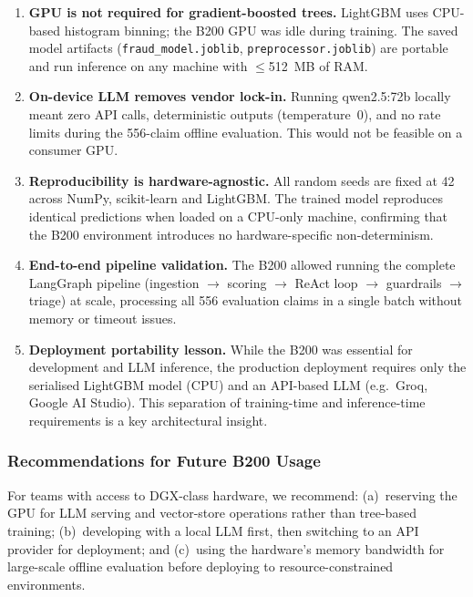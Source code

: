 \documentclass[12pt,a4paper]{article}
\begin{document}
\begin{enumerate}
    \item \textbf{GPU is not required for gradient-boosted trees.} LightGBM uses CPU-based histogram binning; the B200 GPU was idle during training. The saved model artifacts (\texttt{fraud\_model.joblib}, \texttt{preprocessor.joblib}) are portable and run inference on any machine with $\leq$512~MB of RAM.
    \item \textbf{On-device LLM removes vendor lock-in.} Running qwen2.5:72b locally meant zero API calls, deterministic outputs (temperature~0), and no rate limits during the 556-claim offline evaluation. This would not be feasible on a consumer GPU.
    \item \textbf{Reproducibility is hardware-agnostic.} All random seeds are fixed at 42 across NumPy, scikit-learn and LightGBM. The trained model reproduces identical predictions when loaded on a CPU-only machine, confirming that the B200 environment introduces no hardware-specific non-determinism.
    \item \textbf{End-to-end pipeline validation.} The B200 allowed running the complete LangGraph pipeline (ingestion $\rightarrow$ scoring $\rightarrow$ ReAct loop $\rightarrow$ guardrails $\rightarrow$ triage) at scale, processing all 556 evaluation claims in a single batch without memory or timeout issues.
    \item \textbf{Deployment portability lesson.} While the B200 was essential for development and LLM inference, the production deployment requires only the serialised LightGBM model (CPU) and an API-based LLM (e.g.\ Groq, Google AI Studio). This separation of training-time and inference-time requirements is a key architectural insight.
\end{enumerate}

\subsubsection{Recommendations for Future B200 Usage}

For teams with access to DGX-class hardware, we recommend: (a)~reserving the GPU for LLM serving and vector-store operations rather than tree-based training; (b)~developing with a local LLM first, then switching to an API provider for deployment; and (c)~using the hardware's memory bandwidth for large-scale offline evaluation before deploying to resource-constrained environments.


\newpage
\end{document}
